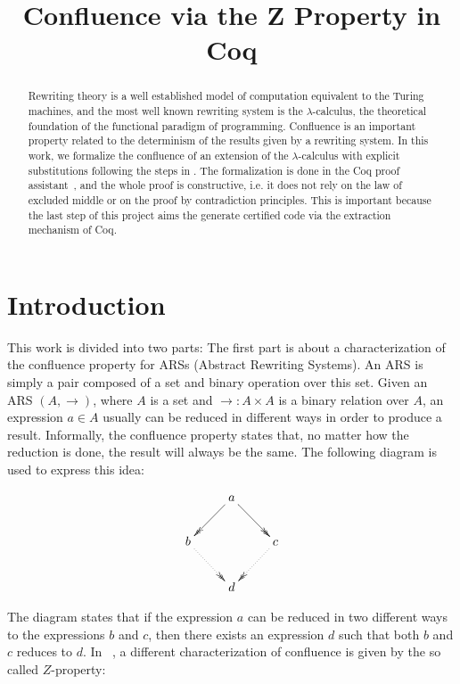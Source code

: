 \documentclass{llncs}
\title{Confluence via the Z Property in Coq}
\author{}
\institute{}
\begin{document}
\maketitle

\begin{abstract}
  Rewriting theory is a well established model of computation
  equivalent to the Turing machines, and the most well known rewriting
  system is the $\lambda$-calculus, the theoretical foundation of the
  functional paradigm of programming. Confluence is an important
  property related to the determinism of the results given by a
  rewriting system. In this work, we formalize the confluence of an
  extension of the $\lambda$-calculus with explicit substitutions
  following the steps in \cite{kes09}. The formalization is done in
  the Coq proof assistant~\cite{CoqTeam}, and the whole proof is
  constructive, i.e. it does not rely on the law of excluded middle or
  on the proof by contradiction principles. This is important because
  the last step of this project aims the generate certified code via
  the extraction mechanism of Coq.
\end{abstract}

\section{Introduction}

This work is divided into two parts: The first part is about a
characterization of the confluence property for ARSs (Abstract
Rewriting Systems). An ARS is simply a pair composed of a set and
binary operation over this set. Given an ARS $(A,\to)$, where $A$ is a
set and $\to:A\times A$ is a binary relation over $A$, an expression
$a\in A$ usually can be reduced in different ways in order to produce
a result. Informally, the confluence property states that, no matter
how the reduction is done, the result will always be the same. The
following diagram is used to express this idea:

\[
  \xymatrix{
    & a \ar@{->>}[dl] \ar@{->>}[dr] & \\
    b \ar@{.>>}[dr] &  & c \ar@{.>>}[dl] \\
    & d & 
  }
\]

The diagram states that if the expression $a$ can be reduced in two
different ways to the expressions $b$ and $c$, then there exists an
expression $d$ such that both $b$ and $c$ reduces to $d$. In
~\cite{ZPropertyDraft}, a different characterization of confluence is
given by the so called $Z$-property:
\end{document}
